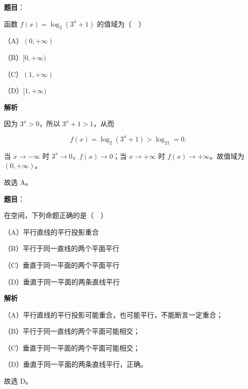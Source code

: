 \begin{answer}

\textbf{题目}：

函数 $f(x)=\log_2(3^x+1)$ 的值域为（　）

（A）$(0,+\infty)$

（B）$[0,+\infty)$

（C）$(1,+\infty)$

（D）$[1,+\infty)$

\textbf{解析}

因为 $3^x>0$，所以 $3^x+1>1$，从而

\nopagebreak[4]
\[f(x)=\log_2(3^x+1)>\log_21=0.\]

当 $x\to-\infty$ 时 $3^x\to0$，$f(x)\to0$；当 $x\to+\infty$ 时 $f(x)\to+\infty$。故值域为 $(0,+\infty)$。

故选 A。


\end{answer}
\begin{answer}

\textbf{题目}：

在空间，下列命题正确的是（　）

（A）平行直线的平行投影重合

（B）平行于同一直线的两个平面平行

（C）垂直于同一平面的两个平面平行

（D）垂直于同一平面的两条直线平行

\textbf{解析}

（A）平行直线的平行投影可能重合，也可能平行，不能断言一定重合；

（B）平行于同一直线的两个平面可能相交；

（C）垂直于同一平面的两个平面可能相交；

（D）垂直于同一平面的两条直线平行，正确。

故选 D。


\end{answer}
